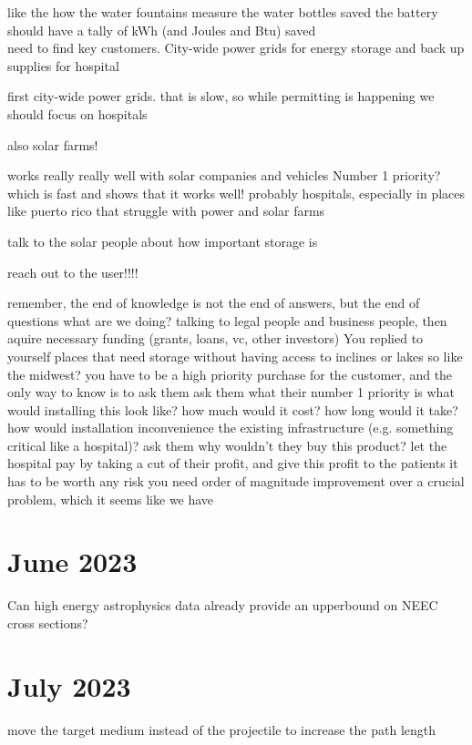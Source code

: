 \documentclass[12pt]{article}
\begin{document}
like the how the water fountains measure the water bottles saved the battery should have a tally of kWh (and Joules and Btu) saved\\

need to find key customers. City-wide power grids for energy storage and back up supplies for hospital

first city-wide power grids. that is slow, so while permitting is happening we should focus on hospitals

also solar farms!

works really really well with solar companies and vehicles
Number 1 priority? which is fast and shows that it works well! probably hospitals, especially in places like puerto rico that struggle with power and solar farms

talk to the solar people about how important storage is

reach out to the user!!!!

remember, the end of knowledge is not the end of answers, but the end of questions
what are we doing?
talking to legal people and business people, then aquire necessary funding (grants, loans, vc, other investors)
You replied to yourself
places that need storage without having access to inclines or lakes
so like the midwest?
you have to be a high priority purchase for the customer, and the only way to know is to ask them
ask them what their number 1 priority is
what would installing this look like? how much would it cost? how long would it take? how would installation inconvenience the existing infrastructure (e.g. something critical like a hospital)?
ask them why wouldn't they buy this product?
let the hospital pay by taking a cut of their profit, and give this profit to the patients
it has to be worth any risk
you need order of magnitude improvement over a crucial problem, which it seems like we have
\section{June 2023}
Can high energy astrophysics data already provide an upperbound on NEEC cross sections? \\
\section{July 2023}
move the target medium instead of the projectile to increase the path length
\end{document}
